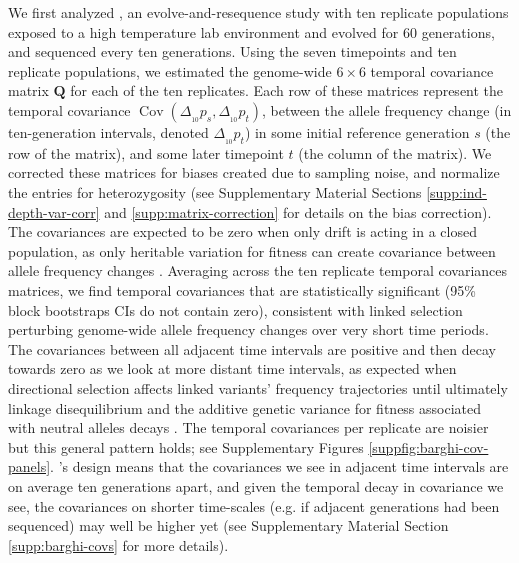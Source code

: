 \documentclass[11pt]{article}
\DeclareMathOperator{\cov}{Cov}
\begin{document}
We first analyzed \textcite{Barghi2019-qy}, an evolve-and-resequence study with
ten replicate populations exposed to a high temperature lab environment and
evolved for 60 generations, and sequenced every ten generations. Using the
seven timepoints and ten replicate populations, we estimated the genome-wide $6
\times 6$ temporal covariance matrix $\mathbf{Q}$ for each of the ten
replicates. Each row of these matrices represent the temporal covariance
$\cov(\Delta_{_{10}} p_s, \Delta_{_{10}} p_t)$, between the allele frequency
change (in ten-generation intervals, denoted $\Delta_{_{10}} p_t$) in some
initial reference generation $s$ (the row of the matrix), and some later
timepoint $t$ (the column of the matrix). We corrected these matrices for
biases created due to sampling noise, and normalize the entries for
heterozygosity (see Supplementary Material Sections
\ref{supp:ind-depth-var-corr} and \ref{supp:matrix-correction} for details on
the bias correction). The covariances are expected to be zero when only drift
is acting in a closed population, as only heritable variation for fitness can
create covariance between allele frequency changes \parencite{Buffalo2019-io}.
Averaging across the ten replicate temporal covariances matrices, we find
temporal covariances that are statistically significant (95\% block bootstraps
CIs do not contain zero), consistent with linked selection perturbing
genome-wide allele frequency changes over very short time periods. The
covariances between all adjacent time intervals are positive and then decay
towards zero as we look at more distant time intervals, as expected when
directional selection affects linked variants' frequency trajectories until
ultimately linkage disequilibrium and the additive genetic variance for fitness
associated with neutral alleles decays \parencite{Buffalo2019-io}. The temporal
covariances per replicate are noisier but this general pattern holds; see
Supplementary Figures \ref{suppfig:barghi-cov-panels}.
\textcite{Barghi2019-qy}'s design means that the covariances we see in adjacent
time intervals are on average ten generations apart, and given the temporal
decay in covariance we see, the covariances on shorter time-scales (e.g. if
adjacent generations had been sequenced) may well be higher yet (see
Supplementary Material Section \ref{supp:barghi-covs} for more details).
\end{document}

